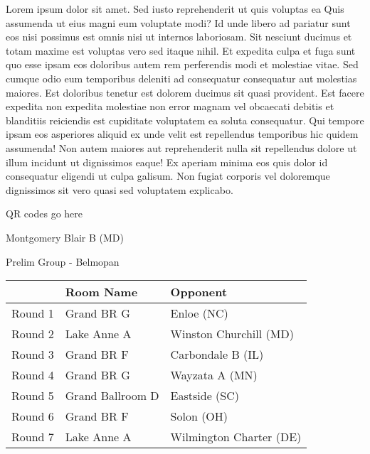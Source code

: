 \documentclass{article}%
\begin{document}
\vspace*{8pt}%
\linebreak%
\newline%
\newline%
Lorem ipsum dolor sit amet. Sed iusto reprehenderit ut quis voluptas ea Quis assumenda ut eius magni eum voluptate modi? Id unde libero ad pariatur sunt eos nisi possimus est omnis nisi ut internos laboriosam. Sit nesciunt ducimus et totam maxime est voluptas vero sed itaque nihil. Et expedita culpa et fuga sunt quo esse ipsam eos doloribus autem rem perferendis modi et molestiae vitae.\newline%
\newline%
Sed cumque odio eum temporibus deleniti ad consequatur consequatur aut molestias maiores. Est doloribus tenetur est dolorem ducimus sit quasi provident. Est facere expedita non expedita molestiae non error magnam vel obcaecati debitis et blanditiis reiciendis est cupiditate voluptatem ea soluta consequatur. Qui tempore ipsam eos asperiores aliquid ex unde velit est repellendus temporibus hic quidem assumenda!\newline%
\newline%
Non autem maiores aut reprehenderit nulla sit repellendus dolore ut illum incidunt ut dignissimos eaque! Ex aperiam minima eos quis dolor id consequatur eligendi ut culpa galisum. Non fugiat corporis vel doloremque dignissimos sit vero quasi sed voluptatem explicabo.\newline%
\newline%
%
\vspace*{30pt}%
\begin{center}%
\begin{Huge}%
QR codes go here%
\end{Huge}%
\end{center}%
\newpage%
%
\begin{center}%
\begin{Huge}%
Montgomery Blair B (MD)%
\end{Huge}%
\vspace*{8pt}%
\linebreak%
\begin{Large}%
Prelim Group {-} Belmopan%
\end{Large}%
\end{center}%
\begin{tabularx}{\textwidth}{|c|Y|Y|}%
\hline%
&Room Name&Opponent\\%
\hline%
Round 1&Grand BR G&Enloe (NC)\\%
Round 2&Lake Anne A&Winston Churchill (MD)\\%
Round 3&Grand BR F&Carbondale B (IL)\\%
Round 4&Grand BR G&Wayzata A (MN)\\%
Round 5&Grand Ballroom D&Eastside (SC)\\%
Round 6&Grand BR F&Solon (OH)\\%
Round 7&Lake Anne A&Wilmington Charter (DE)\\%
\hline%
\end{tabularx}%
\end{document}
